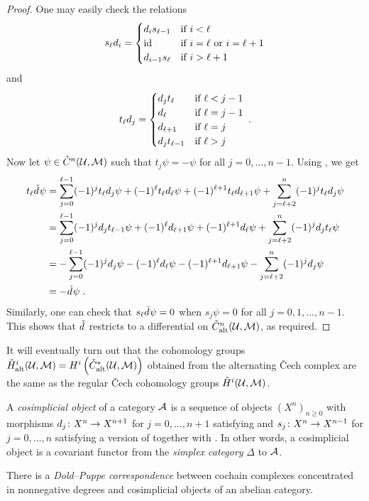 \documentclass[a4paper,parskip=half,numbers=enddot, DIV=12]{scrreprt}
\newcommand{\vC}{\v{C}}
\begin{document}
\begin{proof}
		One may easily check the relations
		\begin{align}\lbl{eq:cosimplicialDegeneracies}
			s_\ell d_i=\begin{cases}
				d_is_{\ell-1} & \text{if }i<\ell\\
				\id &  \text{if }i=\ell\text{ or }i=\ell+1\\
				d_{i-1}s_\ell &  \text{if }i>\ell+1
			\end{cases}
		\end{align}
		and
		\begin{align}\lbl{eq:transpositions}
			t_\ell d_j=\begin{cases}
				d_jt_{\ell} & \text{if }\ell<j-1\\
				d_\ell &  \text{if }\ell=j-1\\
				d_{\ell+1} &  \text{if }\ell=j\\
				d_jt_{\ell-1} & \text{if }\ell>j
			\end{cases}\;.
		\end{align}
		Now let $\psi\in\check{C}^n(\mathcal{U},\mathcal{M})$ such that $t_j\psi=-\psi$ for all $j=0,\ldots,n-1$. Using , we get
		\begin{align*}
			t_\ell\check{d}\hspace{0.06125em}\psi&=\sum_{j=0}^{\ell-1}(-1)^jt_\ell d_j\psi+(-1)^\ell t_\ell d_\ell\psi+(-1)^{\ell+1} t_\ell d_{\ell+1}\psi+\sum_{j=\ell+2}^n(-1)^jt_\ell d_j\psi\\
			&=\sum_{j=0}^{\ell-1}(-1)^jd_jt_{\ell-1}\psi+(-1)^\ell d_{\ell+1}\psi+(-1)^{\ell+1} d_\ell\psi+\sum_{j=\ell+2}^{n}(-1)^j d_jt_\ell\psi\\
			&=-\sum_{j=0}^{\ell-1}(-1)^jd_j\psi-(-1)^\ell d_\ell\psi-(-1)^{\ell+1} d_{\ell+1}\psi-\sum_{j=\ell+2}^{n}(-1)^j d_j\psi\\
			&=-\check{d}\hspace{0.06125em}\psi\;.
		\end{align*}
		Similarly, one can check that $s_\ell\check{d}\hspace{0.06125em}\psi=0$ when $s_j\psi=0$ for all $j=0,1,\ldots,n-1$. This shows that $\check{d}\hspace{0.06125em}$ restricts to a differential on $\check{C}_{\mathrm{alt}}
		^n(\mathcal{U},\mathcal{M})$, as required.
	\end{proof}
	It will eventually turn out that the cohomology groups $\check{H}_{\mathrm{alt}}^i(\mathcal{U},\mathcal{M})=H^i\left(\check{C}_{\mathrm{alt}}^*(\mathcal{U},\mathcal{M})\right)$ obtained from the alternating \vC ech complex are the same as the regular \vC ech cohomology groups $\check{H}^i(\mathcal{U},\mathcal{M})$.
\begin{rem}
	A \emph{cosimplicial object} of a category $\mathcal{A}$ is a sequence of objects $(X^n)_{n\geq 0}$ with morphisms $d_j\colon X^n\morphism X^{n+1}$ for $j=0,\ldots,n+1$ satisfying  and $s_j\colon X^n\morphism X^{n-1}$ for $j=0,\ldots,n$ satisfying a version of  together with . In other words, a cosimplicial object is a covariant functor from the \emph{simplex category} $\Delta$ to $\mathcal{A}$.
	
	There is a \emph{Dold--Puppe correspondence} between cochain complexes concentrated in nonnegative degrees and cosimplicial objects of an abelian category.  
\end{rem}
\end{document}
